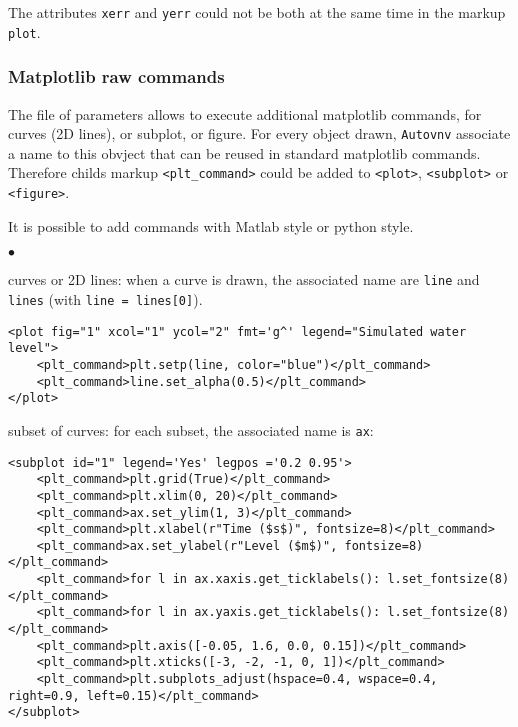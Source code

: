 \documentclass[a4paper,10pt,twoside]{article}
\begin{document}
The attributes \texttt{xerr} and \texttt{yerr} could not be both at the same
time in the markup \texttt{plot}.

\subsubsection{Matplotlib raw commands}\label{sec:raw}

The file of parameters allows to execute additional matplotlib commands,
for curves (2D lines), or subplot, or figure.
For every object drawn, \texttt{Autovnv} associate a name to this obvject
that can be reused in standard matplotlib commands. Therefore childs
markup \texttt{<plt\_command>} could be added to \texttt{<plot>},
\texttt{<subplot>} or \texttt{<figure>}.

It is possible to add commands with Matlab style or python style.

\begin{list}{$\bullet$}{}

\item curves or 2D lines: when a curve is drawn, the associated name
are \texttt{line} and \texttt{lines} (with \texttt{line = lines[0]}).

\small
\begin{verbatim}
<plot fig="1" xcol="1" ycol="2" fmt='g^' legend="Simulated water level">
    <plt_command>plt.setp(line, color="blue")</plt_command>
    <plt_command>line.set_alpha(0.5)</plt_command>
</plot>
\end{verbatim}
\normalsize

\item subset of curves: for each subset, the associated name is \texttt{ax}:

\small
\begin{verbatim}
<subplot id="1" legend='Yes' legpos ='0.2 0.95'>
    <plt_command>plt.grid(True)</plt_command>
    <plt_command>plt.xlim(0, 20)</plt_command>
    <plt_command>ax.set_ylim(1, 3)</plt_command>
    <plt_command>plt.xlabel(r"Time ($s$)", fontsize=8)</plt_command>
    <plt_command>ax.set_ylabel(r"Level ($m$)", fontsize=8)</plt_command>
    <plt_command>for l in ax.xaxis.get_ticklabels(): l.set_fontsize(8)</plt_command>
    <plt_command>for l in ax.yaxis.get_ticklabels(): l.set_fontsize(8)</plt_command>
    <plt_command>plt.axis([-0.05, 1.6, 0.0, 0.15])</plt_command>
    <plt_command>plt.xticks([-3, -2, -1, 0, 1])</plt_command>
    <plt_command>plt.subplots_adjust(hspace=0.4, wspace=0.4, right=0.9, left=0.15)</plt_command>
</subplot>
\end{verbatim}
\normalsize

\end{list}
\end{document}
